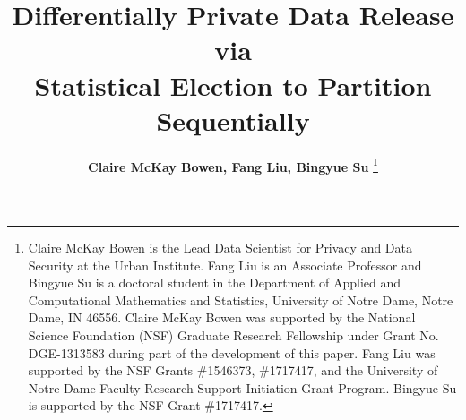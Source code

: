\documentclass[12pt, A4]{article}
\theoremstyle{plain}
\theoremstyle{exampstyle}\newtheorem{defn}{Definition}
\theoremstyle{exampstyle}\newtheorem{lem}{Lemma}
\theoremstyle{exampstyle}\newtheorem{cor}{Corollary}
\theoremstyle{exampstyle}\newtheorem{pro}{Proposition}
\theoremstyle{exampstyle}\newtheorem{cla}{Claim}
\theoremstyle{exampstyle}\newtheorem{rem}{Remark}
\begin{document}
\title{\large{\textbf{Differentially Private Data Release via\\ Statistical Election to Partition Sequentially}}}
\author{\small{\textbf{Claire McKay Bowen, Fang Liu, Bingyue Su}}
\footnote{\noindent Claire McKay Bowen is the Lead Data Scientist for Privacy and Data Security at the Urban Institute. Fang Liu is an Associate Professor and Bingyue Su is a doctoral student in the Department of Applied and Computational Mathematics and Statistics, University of Notre Dame, Notre Dame, IN 46556. Claire McKay Bowen was supported by the National Science Foundation (NSF) Graduate Research Fellowship under Grant No. DGE-1313583 during part of the development of this paper. Fang Liu was supported by the NSF Grants  \#1546373, \#1717417, and the University of Notre Dame Faculty Research Support Initiation Grant Program. Bingyue Su is supported by the NSF Grant \#1717417.} 
\vspace{-3.5cm}
}
\date{}
\maketitle{}

\end{document}

